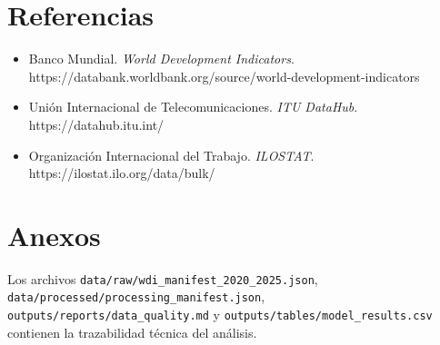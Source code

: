\documentclass[
  spanish,
  letterpaper,
  DIV=11,
  numbers=noendperiod]{scrartcl}
\providecommand{\tightlist}{%
  \setlength{\itemsep}{0pt}\setlength{\parskip}{0pt}}
\begin{document}
\section{Referencias}\label{referencias}

\begin{itemize}
\tightlist
\item
  Banco Mundial. \emph{World Development Indicators}.
  https://databank.worldbank.org/source/world-development-indicators
\item
  Unión Internacional de Telecomunicaciones. \emph{ITU DataHub}.
  https://datahub.itu.int/
\item
  Organización Internacional del Trabajo. \emph{ILOSTAT}.
  https://ilostat.ilo.org/data/bulk/
\end{itemize}

\section{Anexos}\label{anexos}

Los archivos \texttt{data/raw/wdi\_manifest\_2020\_2025.json},
\texttt{data/processed/processing\_manifest.json},
\texttt{outputs/reports/data\_quality.md} y
\texttt{outputs/tables/model\_results.csv} contienen la trazabilidad
técnica del análisis.
\end{document}
